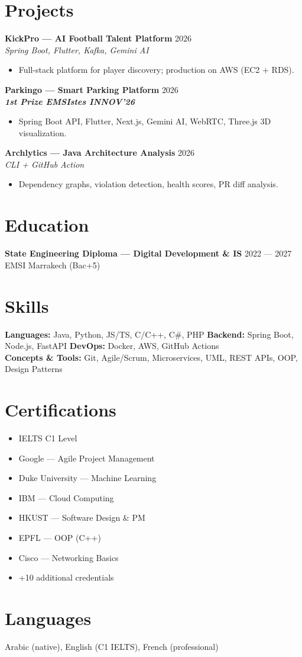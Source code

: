 \documentclass[10.5pt,a4paper]{article}
\newcommand{\role}[4]{%
  \textbf{#1} \hfill {\color{muted}\small #2}\\[-2pt]
  {\color{teal}\textit{#3}}\\[-2pt]
  \begin{itemize}[leftmargin=12pt, nosep, topsep=2pt]
    #4
  \end{itemize}
  \vspace{4pt}
}
\begin{document}
\section{Projects}
\role{KickPro — AI Football Talent Platform}{2026}{Spring Boot, Flutter, Kafka, Gemini AI}{
  \item Full-stack platform for player discovery; production on AWS (EC2 + RDS).
}
\role{Parkingo — Smart Parking Platform}{2026}{\textbf{1st Prize EMSIstes INNOV'26}}{
  \item Spring Boot API, Flutter, Next.js, Gemini AI, WebRTC, Three.js 3D visualization.
}
\role{Archlytics — Java Architecture Analysis}{2026}{CLI + GitHub Action}{
  \item Dependency graphs, violation detection, health scores, PR diff analysis.
}

\section{Education}
\textbf{State Engineering Diploma — Digital Development \& IS} \hfill {\color{muted}\small 2022 — 2027}\\
{\color{teal}EMSI Marrakech (Bac+5)}

\section{Skills}
\small
\textbf{Languages:} Java, Python, JS/TS, C/C++, C\#, PHP \textbar{}
\textbf{Backend:} Spring Boot, Node.js, FastAPI \textbar{}
\textbf{DevOps:} Docker, AWS, GitHub Actions\\
\textbf{Concepts \& Tools:} Git, Agile/Scrum, Microservices, UML, REST APIs, OOP, Design Patterns

\section{Certifications}
\small
\begin{itemize}[leftmargin=10pt, nosep, topsep=0pt]
  \item IELTS C1 Level
  \item Google — Agile Project Management
  \item Duke University — Machine Learning
  \item IBM — Cloud Computing
  \item HKUST — Software Design \& PM
  \item EPFL — OOP (C++)
  \item Cisco — Networking Basics
  \item +10 additional credentials
\end{itemize}

\section{Languages}
\small Arabic (native), English (C1 IELTS), French (professional)
\end{document}
